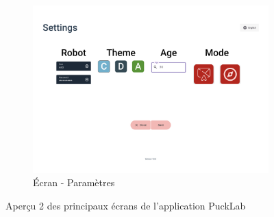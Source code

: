 \begin{figure}[H]
    \begin{subfigure}{0.45\linewidth}
        \centering
        \includegraphics[width=\linewidth]{figures//Settings.png}
        \caption{\label{fig:settings} Écran - Paramètres}
    \end{subfigure}

    \caption{Aperçu 2 des principaux écrans de l'application PuckLab}
    \label{fig:ui_screens-2}
\end{figure}
